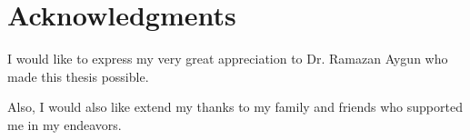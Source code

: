 \chapter*{Acknowledgments}

I would like to express my very great appreciation to Dr. Ramazan Aygun who made this thesis possible.

Also, I would also like extend my thanks to my family and friends who supported me in my endeavors.